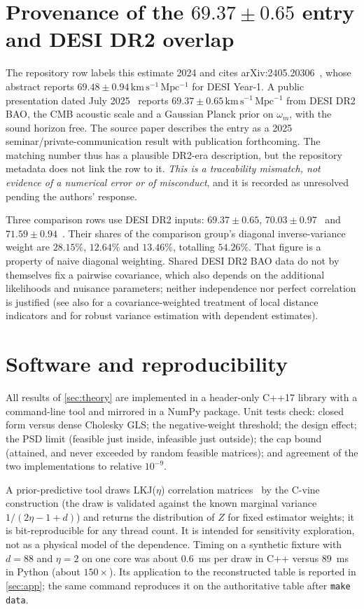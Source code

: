 \documentclass[11pt,a4paper]{article}
\theoremstyle{remark}\newtheorem{remark}{Remark}
\newcommand{\kmsMpc}{\mathrm{km\,s^{-1}\,Mpc^{-1}}}
\newcommand{\unit}{\,\kmsMpc}
\begin{document}
\section{Provenance of the \texorpdfstring{$69.37\pm0.65$}{69.37 +/- 0.65} entry and DESI DR2 overlap}\label{sec:prov}
The repository row labels this estimate 2024 and cites arXiv:2405.20306~\cite{Pogosian2024}, whose abstract reports $69.48\pm0.94\unit$ for DESI Year-1. A public presentation dated July 2025~\cite{PogosianPASCOS2025} reports $69.37\pm0.65\unit$ from DESI DR2 BAO, the CMB acoustic scale and a Gaussian Planck prior on $\omega_m$, with the sound horizon free. The source paper describes the entry as a 2025 seminar/private-communication result with publication forthcoming. The matching number thus has a plausible DR2-era description, but the repository metadata does not link the row to it. \emph{This is a traceability mismatch, not evidence of a numerical error or of misconduct}, and it is recorded as unresolved pending the authors' response.

Three comparison rows use DESI DR2 inputs: $69.37\pm0.65$, $70.03\pm0.97$~\cite{GarciaEscudero2025} and $71.59\pm0.94$~\cite{Du2025}. Their shares of the comparison group's diagonal inverse-variance weight are $28.15\%$, $12.64\%$ and $13.46\%$, totalling $54.26\%$. That figure is a property of naive diagonal weighting. Shared DESI DR2 BAO data do not by themselves fix a pairwise covariance, which also depends on the additional likelihoods and nuisance parameters; neither independence nor perfect correlation is justified (see also \cite{H0DN2026} for a covariance-weighted treatment of local distance indicators and \cite{Hedges2010} for robust variance estimation with dependent estimates).

\section{Software and reproducibility}\label{sec:software}
All results of \cref{sec:theory} are implemented in a header-only C++17 library with a command-line tool and mirrored in a NumPy package. Unit tests check: closed form versus dense Cholesky GLS; the negative-weight threshold; the design effect; the PSD limit (feasible just inside, infeasible just outside); the cap bound (attained, and never exceeded by random feasible matrices); and agreement of the two implementations to relative $10^{-9}$.

A prior-predictive tool draws LKJ($\eta$) correlation matrices~\cite{LKJ2009} by the C-vine construction (the draw is validated against the known marginal variance $1/(2\eta-1+d)$) and returns the distribution of $Z$ for fixed estimator weights; it is bit-reproducible for any thread count. It is intended for sensitivity exploration, not as a physical model of the dependence. Timing on a synthetic fixture with $d=88$ and $\eta=2$ on one core was about $0.6$~ms per draw in C++ versus $89$~ms in Python (about $150\times$). Its application to the reconstructed table is reported in \cref{sec:app}; the same command reproduces it on the authoritative table after \texttt{make data}.
\end{document}
